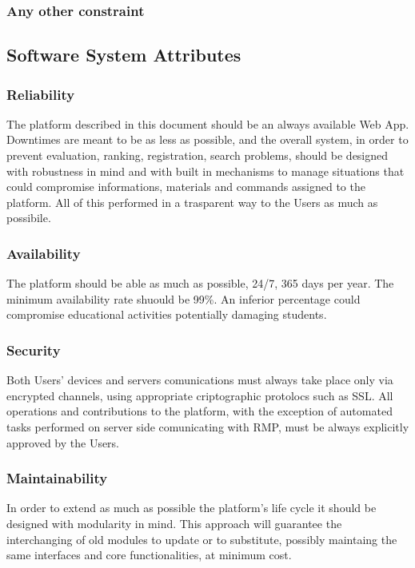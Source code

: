 \subsubsection{Any other constraint}

\subsection{Software System Attributes}

\subsubsection{Reliability}
The platform described in this document should be an always available Web App. Downtimes are meant to be as less as possible, and the overall system, in order to prevent evaluation, ranking, registration, search problems, should be designed with robustness in mind and with built in mechanisms to manage situations that could compromise informations, materials and commands assigned to the platform. All of this performed in a trasparent way to the Users as much as possibile.
\subsubsection{Availability}
The platform should be able as much as possible, 24/7, 365 days per year. The minimum availability rate shuould be 99\%. An inferior percentage could compromise educational activities potentially damaging students.
\subsubsection{Security}
Both Users' devices and servers comunications must always take place only via encrypted channels, using appropriate criptographic protolocs such as SSL. All operations and contributions to the platform, with the exception of automated tasks performed on server side comunicating with RMP, must be always explicitly approved by the Users.
\subsubsection{Maintainability}
In order to extend as much as possible the platform's life cycle it should be designed with modularity in mind. This approach will guarantee the interchanging of old modules to update or to substitute, possibly maintaing the same interfaces and core functionalities, at minimum cost.
